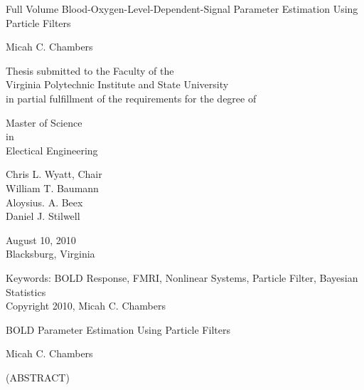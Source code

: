 \documentclass[12pt]{report}
\numberwithin{algorithm}{chapter}
\begin{document}
\thispagestyle{empty}
\begin{center}

{\Large 
Full Volume Blood-Oxygen-Level-Dependent-Signal Parameter Estimation Using Particle Filters
}

\vfill

Micah C. Chambers

\vfill

Thesis submitted to the Faculty of the \\
Virginia Polytechnic Institute and State University \\
in partial fulfillment of the requirements for the degree of

\vfill

Master of Science \\
in \\
Electical Engineering

\vfill

Chris L. Wyatt, Chair \\
William T. Baumann\\
Aloysius. A. Beex \\
Daniel J. Stilwell

\vfill

August 10, 2010\\
Blacksburg, Virginia

\vfill

Keywords: BOLD Response, FMRI, Nonlinear Systems, Particle Filter, Bayesian Statistics
\\
Copyright 2010, Micah C. Chambers

\end{center}

\pagebreak

\thispagestyle{empty}
\begin{center}

{\large BOLD Parameter Estimation Using Particle 
Filters }

\vfill

Micah C. Chambers

\vfill

(ABSTRACT)

\vfill

\end{center}
\end{document}
